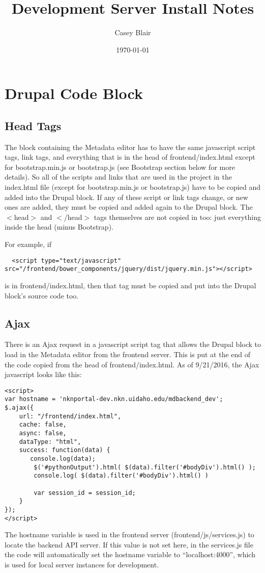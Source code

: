 \documentclass[a4paper, 12pt]{article}
\title{Development Server Install Notes}
\author{Casey Blair}
\date{\today}
\begin{document}
\maketitle

\section{Drupal Code Block}
\subsection{Head Tags}
\par\indent
The block containing the Metadata editor has to have the same javascript script tags, link tags, and everything that is in the head of frontend/index.html except for bootstrap.min.js or bootstrap.js (see Bootstrap section below for more details). So all of the scripts and links that are used in the project in the index.html file (except for bootstrap.min.js or bootstrap.js) have to be copied and added into the Drupal block. If any of these script or link tags change, or new ones are added, they must be copied and added again to the Drupal block. The $<$head$>$ and $<$/head$>$ tags themselves are not copied in too: just everything inside the head (minus Bootstrap).

\par\indent
For example, if
\begin{lstlisting}
  <script type="text/javascript" src="/frontend/bower_components/jquery/dist/jquery.min.js"></script>
\end{lstlisting}
is in frontend/index.html, then that tag must be copied and put into the Drupal block's source code too.

\subsection{Ajax}
\par\indent
There is an Ajax request in a javascript script tag that allows the Drupal block to load in the Metadata editor from the frontend server. This is put at the end of the code copied from the head of frontend/index.html. As of 9/21/2016, the Ajax javascript looks like this:
\begin{lstlisting}
<script>
var hostname = 'nknportal-dev.nkn.uidaho.edu/mdbackend_dev';
$.ajax({
    url: "/frontend/index.html",
    cache: false,
    async: false,
    dataType: "html",
    success: function(data) {
       console.log(data);
        $('#pythonOutput').html( $(data).filter('#bodyDiv').html() );
        console.log( $(data).filter('#bodyDiv').html() )

        var session_id = session_id;     
    }
});
</script>
\end{lstlisting}
\par\indent
The hostname variable is used in the frontend server (frontend/js/services.js) to locate the backend API server. If this value is not set here, in the services.js file the code will automatically set the hostname variable to ``localhost:4000'', which is used for local server instances for development.
\end{document}
